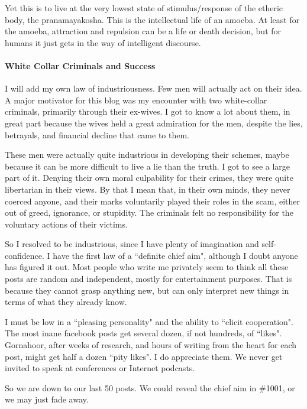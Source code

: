 Yet this is to live at the very lowest state of stimulus/response of the etheric body, the pranamayakosha. This is the intellectual life of an amoeba. At least for the amoeba, attraction and repulsion can be a life or death decision, but for humans it just gets in the way of intelligent discourse.

\paragraph{White Collar Criminals and Success}
I will add my own law of industriousness. Few men will actually act on their idea. A major motivator for this blog was my encounter with two white-collar criminals, primarily through their ex-wives. I got to know a lot about them, in great part because the wives held a great admiration for the men, despite the lies, betrayals, and financial decline that came to them.

These men were actually quite industrious in developing their schemes, maybe because it can be more difficult to live a lie than the truth. I got to see a large part of it. Denying their own moral culpability for their crimes, they were quite libertarian in their views. By that I mean that, in their own minds, they never coerced anyone, and their marks voluntarily played their roles in the scam, either out of greed, ignorance, or stupidity. The criminals felt no responsibility for the voluntary actions of their victims.

So I resolved to be industrious, since I have plenty of imagination and self-confidence. I have the first law of a ``definite chief aim", although I doubt anyone has figured it out. Most people who write me privately seem to think all these posts are random and independent, mostly for entertainment purposes. That is because they cannot grasp anything new, but can only interpret new things in terms of what they already know.

I must be low in a ``pleasing personality" and the ability to ``elicit cooperation". The most inane facebook posts get several dozen, if not hundreds, of ``likes". Gornahoor, after weeks of research, and hours of writing from the heart for each post, might get half a dozen ``pity likes". I do appreciate them. We never get invited to speak at conferences or Internet podcasts.

So we are down to our last 50 posts. We could reveal the chief aim in \#1001, or we may just fade away.

